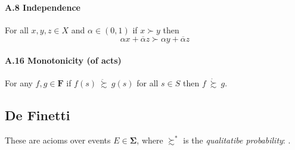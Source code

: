 \documentclass[landscape, 12pt]{extarticle}
\newcommand{\dsuccsim}{\ \dot \succsim \ }
\newcommand{\ddsuccsim}{\ \ddot \succsim \ }
\begin{document}
\begin{multicols}{2}
	\paragraph{A.8 Independence}
	For all $x, y, z \in X$ and $\alpha \in (0,1)$
	if $x \succ y$ then
	\[
		\alpha x + \overline \alpha z \succ \alpha y + \overline \alpha z
	\]

	\paragraph{A.16 Monotonicity (of acts)}
	For any $f, g \in \bm F$ if $f(s) \ddsuccsim g(s)$ for all $s \in S$
	then $f \dsuccsim g$.


	\subsection{De Finetti}
	These are acioms over events $E \in \bm \Sigma$,
	where $\succsim^*$ is the \textit{qualitatibe probability}:
	.


\end{multicols}
\end{document}
